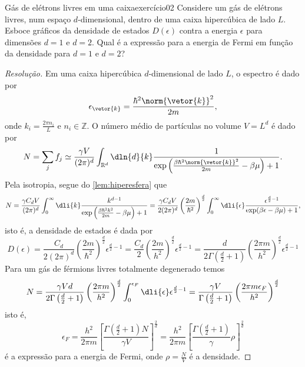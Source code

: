\begin{exercício}{Gás de elétrons livres em uma caixa}{exercício02}
    Considere um gás de elétrons livres, num espaço \(d\)-dimensional, dentro de uma caixa hipercúbica de lado \(L\). Esboce gráficos da densidade de estados \(D(\epsilon)\) contra a energia \(\epsilon\) para dimensões \(d = 1\) e \(d = 2\). Qual é a expressão para a energia de Fermi em função da densidade para \(d = 1\) e \(d = 2\)?
\end{exercício}
\begin{proof}[Resolução]
    Em uma caixa hipercúbica \(d\)-dimensional de lado \(L\), o espectro é dado por
    \begin{equation*}
        \epsilon_{\vetor{k}} = \frac{\hbar^2\norm{\vetor{k}}^2}{2m},
    \end{equation*}
    onde \(k_i = \frac{2\pi n_i}{L}\) e \(n_i \in \mathbb{Z}\). O número médio de partículas no volume \(V = L^d\) é dado por
    \begin{equation*}
        N = \sum_j f_j \simeq \frac{\gamma V}{(2\pi)^d} \int_{\mathbb{R}^d}\dln{d}{k} \frac{1}{\exp\left(\frac{\beta\hbar^2\norm{\vetor{k}}^2}{2m} - \beta \mu\right) + 1}.
    \end{equation*}
    Pela isotropia, segue do \cref{lem:hiperesfera} que
    \begin{equation*}
        N = \frac{\gamma C_d V}{(2\pi)^d} \int_{0}^\infty\dli{k} \frac{k^{d - 1}}{\exp\left(\frac{\beta \hbar^2 k^2}{2m} - \beta \mu\right)+ 1} = \frac{\gamma C_d V}{2(2\pi)^d}  \left(\frac{2m}{\hbar^2}\right)^{\frac{d}2} \int_0^\infty \dli{\epsilon} \frac{\epsilon^{\frac{d}{2} - 1}}{\exp(\beta \epsilon - \beta \mu) + 1},
    \end{equation*}
    isto é, a densidade de estados é dada por
    \begin{equation*}
        D(\epsilon) = \frac{C_d}{2(2\pi)^d}\left(\frac{2m}{\hbar^2}\right)^{\frac{d}{2}} \epsilon^{\frac{d}{2} - 1} = \frac{C_d}{2}\left(\frac{2m}{h^2}\right)^{\frac{d}{2}} \epsilon^{\frac{d}{2} - 1} = \frac{d}{2 \Gamma\left(\frac{d}{2} + 1\right)}\left(\frac{2\pi m}{h^2}\right)^{\frac{d}{2}} \epsilon^{\frac{d}{2} - 1}
    \end{equation*}
    Para um gás de férmions livres totalmente degenerado temos
    \begin{equation*}
        N = \frac{\gamma V d}{2 \Gamma\left(\frac{d}{2} + 1\right)}\left(\frac{2\pi m}{h^2}\right)^{\frac{d}{2}} \int_0^{\epsilon_F} \dli{\epsilon} \epsilon^{\frac{d}{2}-1} = \frac{\gamma V}{\Gamma\left(\frac{d}{2} + 1\right)}\left(\frac{2\pi m \epsilon_F}{h^2}\right)^{\frac{d}{2}}
    \end{equation*}
    isto é,
    \begin{equation*}
        \epsilon_F = \frac{h^2}{2\pi m}\left[\frac{\Gamma\left(\frac{d}{2}+1\right)N}{\gamma V}\right]^{\frac2d} = \frac{h^2}{2\pi m}\left[\frac{\Gamma\left(\frac{d}{2} + 1\right)}{\gamma}\rho\right]^{\frac2d}
    \end{equation*}
    é a expressão para a energia de Fermi, onde \(\rho = \frac{N}{V}\) é a densidade.
\end{proof}
